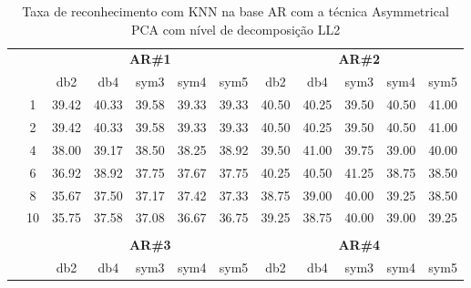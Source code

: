 \begin{table}[H]
	\centering
    \normalsize
	\caption{Taxa de reconhecimento com KNN na base AR com a técnica Asymmetrical PCA com nível de decomposição LL2}
	\begin{tabular}{|c|c|c c c c c|c c c c c|}
\cline{3-12}
\multicolumn{2}{c|}{\multirow{2}{*}{}} & \multicolumn{5}{c|}{\textbf{AR\#1}}  & \multicolumn{5}{c|}{\textbf{AR\#2}} \\\cline{3-12}

\multicolumn{2}{c|}{}  & db2 & db4 & sym3 & sym4 & sym5 & db2 & db4& sym3 & sym4 & sym5 \\\hline

\multicolumn{1}{|c|}{ \multirow{5}{*}{\rotatebox[origin=c]{90}{\textbf{K-vizinhos}}} }
&1	&39.42	&40.33	&39.58	&39.33	&39.33	&40.50	&40.25	&39.50	&40.50	&41.00\\\cline{2-12}
&2	&39.42	&40.33	&39.58	&39.33	&39.33	&40.50	&40.25	&39.50	&40.50	&41.00\\\cline{2-12}
&4	&38.00	&39.17	&38.50	&38.25	&38.92	&39.50	&41.00	&39.75	&39.00	&40.00\\\cline{2-12}
&6	&36.92	&38.92	&37.75	&37.67	&37.75	&40.25	&40.50	&41.25	&38.75	&38.50\\\cline{2-12}
&8	&35.67	&37.50	&37.17	&37.42	&37.33	&38.75	&39.00	&40.00	&39.25	&38.50\\\cline{2-12}
&10	&35.75	&37.58	&37.08	&36.67	&36.75	&39.25	&38.75	&40.00	&39.00	&39.25%

\\ \midrule
\multicolumn{12}{c}{}\\ 




\cline{3-12}
\multicolumn{2}{c}{} & \multicolumn{5}{|c|}{\textbf{AR\#3}}  & \multicolumn{5}{c|}{\textbf{AR\#4}} \\\cline{3-12}
\multicolumn{2}{c}{}  & \multicolumn{1}{|c}{db2} & db4 & sym3 & sym4 & sym5 & db2 & db4& sym3 & sym4 & sym5 \\\hline


\end{tabular}
\end{table}
